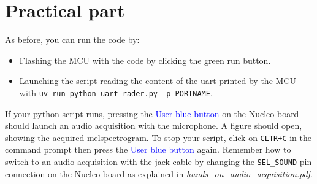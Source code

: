 \section{Practical part}
%
As before, you can run the code by:
\begin{itemize}
	\item Flashing the MCU with the code by clicking the green run button.
	\item Launching the script reading the content of the uart printed by the MCU with \texttt{uv run python uart-rader.py -p PORTNAME}.
\end{itemize}
If your python script runs, pressing the \textcolor{blue}{User blue button} on the Nucleo board should launch an audio acquisition with the microphone. A figure should open, showing the acquired melspectrogram. To stop your script, click on \texttt{CLTR+C} in the command prompt then press the \textcolor{blue}{User blue button} again.  Remember how to switch to an audio acquisition with the jack cable by changing the \texttt{SEL\_SOUND} pin connection on the Nucleo board as explained in \emph{hands\_on\_audio\_acquisition.pdf}.
%
